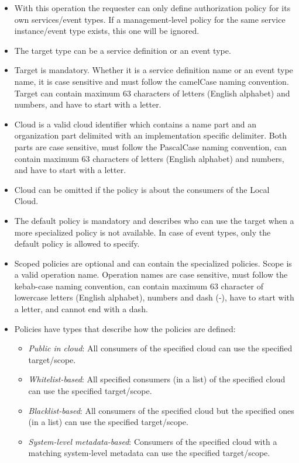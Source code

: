 \documentclass[a4paper]{arrowhead}
\begin{document}
\begin{itemize}
    \item With this operation the requester can only define authorization policy for its own services/event types. If a management-level policy for the same service instance/event type exists, this one will be ignored. 
    \item The target type can be a service definition or an event type. 
    \item Target is mandatory. Whether it is a service definition name or an event type name, it is case sensitive and must follow the camelCase naming convention. Target can contain maximum 63 characters of letters (English alphabet) and numbers, and have to start with a letter.
    \item Cloud is a valid cloud identifier which contains a name part and an organization part delimited with an implementation specific delimiter. Both parts are case sensitive, must follow the PascalCase naming convention, can contain maximum 63 characters of letters (English alphabet) and numbers, and have to start with a letter.
    \item Cloud can be omitted if the policy is about the consumers of the Local Cloud. 
    \item The default policy is mandatory and describes who can use the target when a more specialized policy is not available. In case of event types, only the default policy is allowed to specify.
    \item Scoped policies are optional and can contain the specialized policies. Scope is a valid operation name. Operation names are case sensitive, must follow the kebab-case naming convention, can contain maximum 63 character of lowercase letters (English alphabet), numbers and dash (-), have to start with a letter, and cannot end with a dash.
    \item Policies have types that describe how the policies are defined:
        \begin{itemize}
            \item \textit{Public in cloud}: All consumers of the specified cloud can use the specified target/scope.
            \item \textit{Whitelist-based}: All specified consumers (in a list) of the specified cloud can use the specified target/scope.
            \item \textit{Blacklist-based}: All consumers of the specified cloud but the specified ones (in a list) can use the specified target/scope.
            \item \textit{System-level metadata-based}: Consumers of the specified cloud with a matching system-level metadata can use the specified target/scope.

\end{itemize}
\end{itemize}
\end{document}
